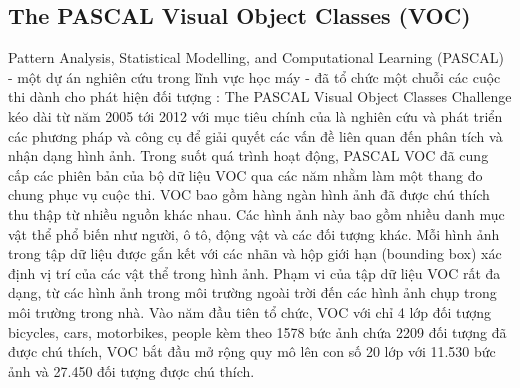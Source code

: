 \documentclass[a4paper]{article}
\begin{document}
\subsection{The PASCAL Visual Object Classes (VOC)}

Pattern Analysis, Statistical Modelling, and Computational Learning (PASCAL) - một dự án nghiên cứu trong lĩnh vực học máy - đã tổ chức một chuỗi các cuộc thi dành cho phát hiện đối tượng : The PASCAL Visual Object Classes Challenge kéo dài từ năm 2005 tới 2012 với mục tiêu chính của  là nghiên cứu và phát triển các phương pháp và công cụ để giải quyết các vấn đề liên quan đến phân tích và nhận dạng hình ảnh. Trong suốt quá trình hoạt động, PASCAL VOC đã cung cấp các phiên bản của bộ dữ liệu VOC qua các năm nhằm làm một thang đo chung phục vụ cuộc thi. VOC bao gồm hàng ngàn hình ảnh đã được chú thích thu thập từ nhiều nguồn khác nhau. Các hình ảnh này bao gồm nhiều danh mục vật thể phổ biến như người, ô tô, động vật và các đối tượng khác. Mỗi hình ảnh trong tập dữ liệu được gắn kết với các nhãn và hộp giới hạn (bounding box) xác định vị trí của các vật thể trong hình ảnh. Phạm vi của tập dữ liệu VOC rất đa dạng, từ các hình ảnh trong môi trường ngoài trời đến các hình ảnh chụp trong môi trường trong nhà. Vào năm đầu tiên tổ chức, VOC với chỉ 4 lớp đối tượng bicycles, cars, motorbikes, people kèm theo 1578 bức ảnh chứa 2209 đối tượng đã được chú thích, VOC bắt đầu mở rộng quy mô lên con số 20 lớp với 11.530 bức ảnh và 27.450 đối tượng được chú thích.
\end{document}
